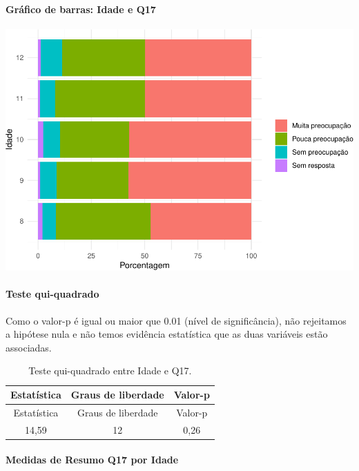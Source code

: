 \documentclass[]{article}
\let\oldparagraph\paragraph
\renewcommand{\paragraph}[1]{\oldparagraph{#1}\mbox{}}
\begin{document}
\hypertarget{gruxe1fico-de-barras-idade-e-q17}{%
\paragraph{Gráfico de barras: Idade e Q17}\label{gruxe1fico-de-barras-idade-e-q17}}

\begin{center}\includegraphics[width=0.75\linewidth]{relatorio_covid19_files/figure-latex/unnamed-chunk-211-1} \end{center}

\hypertarget{teste-qui-quadrado-19}{%
\paragraph{Teste qui-quadrado}\label{teste-qui-quadrado-19}}

Como o valor-p é igual ou maior que 0.01 (nível de significância), não rejeitamos a hipótese nula e não temos evidência estatística que as duas variáveis estão associadas.

\begin{longtable}[]{@{}ccc@{}}
\caption{\label{tab:unnamed-chunk-213}Teste qui-quadrado entre Idade e Q17.}\tabularnewline
\toprule
Estatística & Graus de liberdade & Valor-p\tabularnewline
\midrule
\endfirsthead
\toprule
Estatística & Graus de liberdade & Valor-p\tabularnewline
\midrule
\endhead
14,59 & 12 & 0,26\tabularnewline
\bottomrule
\end{longtable}

\cleardoublepage

\hypertarget{medidas-de-resumo-q17-por-idade}{%
\paragraph{Medidas de Resumo Q17 por Idade}\label{medidas-de-resumo-q17-por-idade}}
\end{document}
